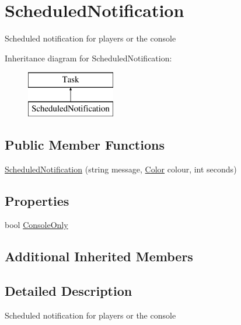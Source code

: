 \hypertarget{classOTA_1_1ScheduledNotification}{}\section{Scheduled\+Notification}
\label{classOTA_1_1ScheduledNotification}


Scheduled notification for players or the console  


Inheritance diagram for Scheduled\+Notification\+:\begin{figure}[H]
\begin{center}
\leavevmode
\includegraphics[height=2.000000cm]{classOTA_1_1ScheduledNotification}
\end{center}
\end{figure}
\subsection*{Public Member Functions}
\begin{DoxyCompactItemize}
\item 
\hyperlink{classOTA_1_1ScheduledNotification_a59487a3a18e859fe596cf5b497672ab4}{Scheduled\+Notification} (string message, \hyperlink{structMicrosoft_1_1Xna_1_1Framework_1_1Color}{Color} colour, int seconds)
\end{DoxyCompactItemize}
\subsection*{Properties}
\begin{DoxyCompactItemize}
\item 
bool \hyperlink{classOTA_1_1ScheduledNotification_a087cc190111526fa9461328196e4a499}{Console\+Only}
\end{DoxyCompactItemize}
\subsection*{Additional Inherited Members}


\subsection{Detailed Description}
Scheduled notification for players or the console 



